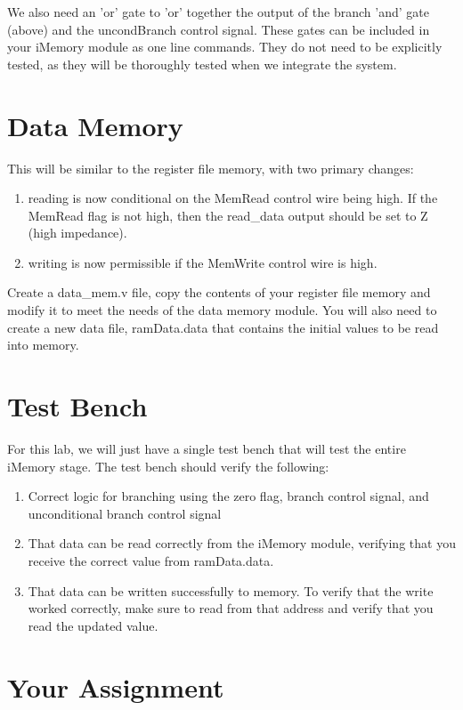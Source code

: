 We also need an 'or' gate to 'or' together the output of the branch 'and' gate (above) and the uncondBranch control signal.  These gates can be included in your iMemory module as one line commands.  They do not need to be explicitly tested, as they will be thoroughly tested when we integrate the system.  

\section{Data Memory}

This will be similar to the register file memory, with two primary changes:
\begin{enumerate}
\item reading is now conditional on the MemRead control wire being high.  If the MemRead flag is not high, then the read\_data output should be set to Z (high impedance).
\item writing is now permissible if the MemWrite control wire is high.
\end{enumerate}
Create a data\_mem.v file, copy the contents of your register file memory and modify it to meet the needs of the data memory module.  You will also need to create a new data file, ramData.data that contains the initial values to be read into memory.

\section{Test Bench}
For this lab, we will just have a single test bench that will test the entire iMemory stage.  The test bench should verify the following:
\begin{enumerate}
	\item Correct logic for branching using the zero flag, branch control signal, and unconditional branch control signal
	\item That data can be read correctly from the iMemory module, verifying that you receive the correct value from ramData.data.
	\item That data can be written successfully to memory.  To verify that the write worked correctly, make sure to read from that address and verify that you read the updated value.  
\end{enumerate}


\section{Your Assignment}

